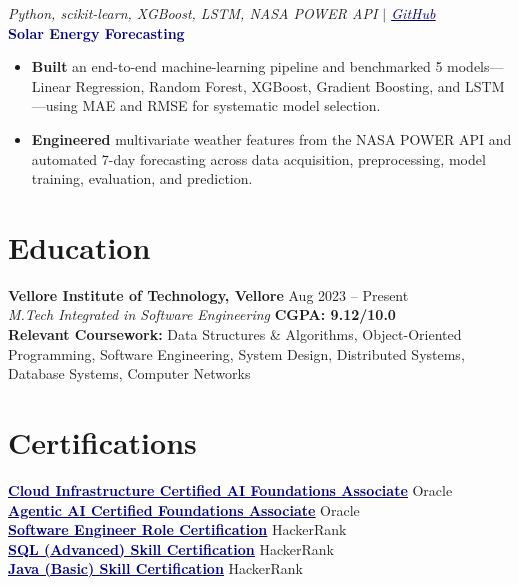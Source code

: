 \documentclass[a4paper,10pt]{article}
\newcommand{\navylink}[2]{\href{#1}{\textcolor{navy}{\uline{#2}}}}
\newcommand{\projectheader}[4]{%
  \vspace{2pt}
  {\hfill \fontsize{8.5}{10}\selectfont\itshape\textcolor{dategray}{#2} $|$ \navylink{#4}{#3}}\\[-9pt]
  {\textcolor{navy}{\textbf{#1}}}\vspace{1pt}
}
\begin{document}
\projectheader{Solar Energy Forecasting}{Python, scikit-learn, XGBoost, LSTM, NASA POWER API}{GitHub}{https://github.com/Shri-Sanjaykumar/solar-energy-forecasting}
\begin{itemize}[leftmargin=0.19in, itemsep=1pt, topsep=2pt, parsep=0pt]
    \item \textbf{Built} an end-to-end machine-learning pipeline and benchmarked 5 models---Linear Regression, Random Forest, XGBoost, Gradient Boosting, and LSTM---using MAE and RMSE for systematic model selection.
    \item \textbf{Engineered} multivariate weather features from the NASA POWER API and automated 7-day forecasting across data acquisition, preprocessing, model training, evaluation, and prediction.
\end{itemize}

\section{Education}
\textbf{Vellore Institute of Technology, Vellore} \hfill \textcolor{dategray}{Aug 2023 -- Present} \\
\textit{M.Tech Integrated in Software Engineering} \hfill \textbf{CGPA: 9.12/10.0} \\
\textbf{Relevant Coursework:} Data Structures \& Algorithms, Object-Oriented Programming, Software Engineering, System Design, Distributed Systems, Database Systems, Computer Networks

\section{Certifications}
\textbf{\navylink{https://catalog-education.oracle.com/pls/certview/sharebadge?id=FC6E3F8AB9971E72946BD9ED3DB8104F0CC00597A44F35DB500F11EAB2565425}{Cloud Infrastructure Certified AI Foundations Associate}} \hfill Oracle \\[1pt]
\textbf{\navylink{https://catalog-education.oracle.com/ords/certview/sharebadge?id=99707AD7CBDB65050635C8B57090D5A13D6371C49A3FED415C0215AF843E7A04}{Agentic AI Certified Foundations Associate}} \hfill Oracle \\[1pt]
\textbf{\navylink{https://drive.google.com/file/d/17mM6JOFQRAaN-D9ZETAm1oF__SpRy2-6/view?usp=sharing}{Software Engineer Role Certification}} \hfill HackerRank \\[1pt]
\textbf{\navylink{https://drive.google.com/file/d/13Z6KOukU2_8xBA6i6l2sajIgJlxwzsSy/view?usp=sharing}{SQL (Advanced) Skill Certification}} \hfill HackerRank \\[1pt]
\textbf{\navylink{https://drive.google.com/file/d/1vM0O20uitDqHrypwxGs9cyIz43h6hnWH/view?usp=sharing}{Java (Basic) Skill Certification}} \hfill HackerRank
\end{document}
